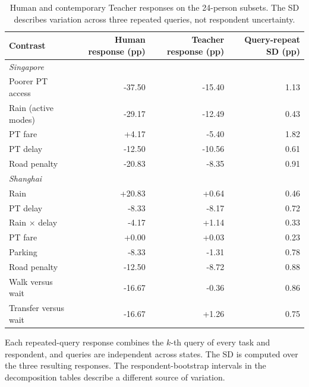 \begin{table}[pos=htbp]
\centering\footnotesize
\caption{Human and contemporary Teacher responses on the 24-person subsets. The SD describes variation across three repeated queries, not respondent uncertainty.}
\label{tab:teacher_query_repeats}
\setlength{\tabcolsep}{3pt}
\renewcommand{\arraystretch}{1.15}
\begin{tabular*}{\linewidth}{@{\extracolsep{\fill}}lrrr@{}}
\toprule
Contrast & Human response (pp) & Teacher response (pp) & Query-repeat SD (pp) \\
\midrule
\multicolumn{4}{l}{\textit{Singapore}} \\
Poorer PT access & -37.50 & -15.40 & 1.13 \\
Rain (active modes) & -29.17 & -12.49 & 0.43 \\
PT fare & +4.17 & -5.40 & 1.82 \\
PT delay & -12.50 & -10.56 & 0.61 \\
Road penalty & -20.83 & -8.35 & 0.91 \\
\midrule
\multicolumn{4}{l}{\textit{Shanghai}} \\
Rain & +20.83 & +0.64 & 0.46 \\
PT delay & -8.33 & -8.17 & 0.72 \\
Rain $\times$ delay & -4.17 & +1.14 & 0.33 \\
PT fare & +0.00 & +0.03 & 0.23 \\
Parking & -8.33 & -1.31 & 0.78 \\
Road penalty & -12.50 & -8.72 & 0.88 \\
Walk versus wait & -16.67 & -0.36 & 0.86 \\
Transfer versus wait & -16.67 & +1.26 & 0.75 \\
\bottomrule
\end{tabular*}
\par\smallskip\begin{minipage}{\linewidth}\footnotesize
Each repeated-query response combines the $k$-th query of every task and respondent, and queries are independent across states. The SD is computed over the three resulting responses. The respondent-bootstrap intervals in the decomposition tables describe a different source of variation.
\end{minipage}
\end{table}

